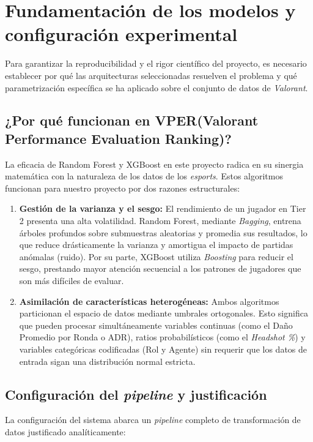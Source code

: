 \documentclass{ULBreport} %
\begin{document}
\section{Fundamentación de los modelos y configuración experimental}

Para garantizar la reproducibilidad y el rigor científico del proyecto, es necesario establecer por qué las arquitecturas seleccionadas resuelven el problema y qué parametrización específica se ha aplicado sobre el conjunto de datos de \textit{Valorant}.

\subsection{¿Por qué funcionan en VPER(Valorant Performance Evaluation Ranking)?}

La eficacia de Random Forest y XGBoost en este proyecto radica en su sinergia matemática con la naturaleza de los datos de los \textit{esports}. Estos algoritmos funcionan para nuestro proyecto por dos razones estructurales:

\begin{enumerate}
    \item \textbf{Gestión de la varianza y el sesgo:} El rendimiento de un jugador en Tier 2 presenta una alta volatilidad. Random Forest, mediante \textit{Bagging}, entrena árboles profundos sobre submuestras aleatorias y promedia sus resultados, lo que reduce drásticamente la varianza y amortigua el impacto de partidas anómalas (ruido). Por su parte, XGBoost utiliza \textit{Boosting} para reducir el sesgo, prestando mayor atención secuencial a los patrones de jugadores que son más difíciles de evaluar.
    \item \textbf{Asimilación de características heterogéneas:} Ambos algoritmos particionan el espacio de datos mediante umbrales ortogonales. Esto significa que pueden procesar simultáneamente variables continuas (como el Daño Promedio por Ronda o ADR), ratios probabilísticos (como el \textit{Headshot \%}) y variables categóricas codificadas (Rol y Agente) sin requerir que los datos de entrada sigan una distribución normal estricta.
\end{enumerate}

\subsection{Configuración del \textit{pipeline} y justificación}

La configuración del sistema abarca un \textit{pipeline} completo de transformación de datos justificado analíticamente:
\end{document}
